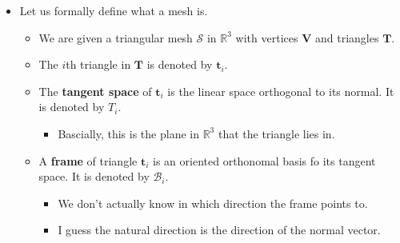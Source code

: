 \documentclass[10pt]{article}
\newcommand{\ve}[1]{\mathbf{#1}}
\newcommand{\mcal}[1]{\mathcal{#1}}
\newcommand{\Real}{\mathbb{R}}
\begin{document}
\begin{itemize}
    \item Let us formally define what a mesh is.
    \begin{itemize}
        \item We are given a triangular mesh $\mcal{S}$ in $\Real^3$ with vertices $\ve{V}$ and triangles $\ve{T}$.
        \item The $i$th triangle in $\ve{T}$ is denoted by $\ve{t}_i$.
        \item The {\bf tangent space} of $\ve{t}_i$ is the linear space orthogonal to its normal. It is denoted by $T_i$.
        \begin{itemize}
            \item Bascially, this is the plane in $\Real^3$ that the triangle lies in.
        \end{itemize}
        \item A {\bf frame} of triangle $\ve{t}_i$ is an oriented orthonomal basis fo its tangent space. It is denoted by $\mcal{B}_i$.
        \begin{itemize}
            \item We don't actually know in which direction the frame points to.
            \item I guess the natural direction is the direction of the normal vector.            
        \end{itemize}
    \end{itemize}


\end{itemize}
\end{document}
